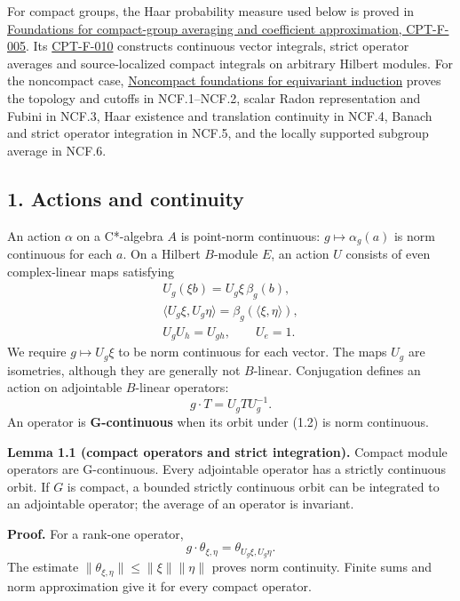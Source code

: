 \documentclass[
  11pt,
]{article}
\begin{document}
For compact groups, the Haar probability measure used below is proved in
\href{supporting/representations-of-compact-groups/compact-foundations.html\#cpt-f-005}{Foundations
for compact-group averaging and coefficient approximation, CPT-F-005}.
Its
\href{supporting/representations-of-compact-groups/compact-foundations.html\#cpt-f-010}{CPT-F-010}
constructs continuous vector integrals, strict operator averages and
source-localized compact integrals on arbitrary Hilbert modules. For the
noncompact case,
\href{supporting/noncompact-foundations/noncompact-foundations.html}{Noncompact
foundations for equivariant induction} proves the topology and cutoffs
in NCF.1--NCF.2, scalar Radon representation and Fubini in NCF.3, Haar
existence and translation continuity in NCF.4, Banach and strict
operator integration in NCF.5, and the locally supported subgroup
average in NCF.6.

\subsection{1. Actions and continuity}\label{actions-and-continuity}

An action \(\alpha\) on a C*-algebra \(A\) is point-norm continuous:
\(g\mapsto\alpha_g(a)\) is norm continuous for each \(a\). On a Hilbert
\(B\)-module \(E\), an action \(U\) consists of even complex-linear maps
satisfying \[
\begin{gathered}
U_g(\xi b)=U_g\xi\,\beta_g(b),\\
\langle U_g\xi,U_g\eta\rangle
 =\beta_g(\langle\xi,\eta\rangle),\\
U_gU_h=U_{gh},\qquad U_e=1.
\end{gathered}
\tag{1.1}
\] We require \(g\mapsto U_g\xi\) to be norm continuous for each vector.
The maps \(U_g\) are isometries, although they are generally not
\(B\)-linear. Conjugation defines an action on adjointable \(B\)-linear
operators: \[
g\cdot T=U_gTU_g^{-1}.
\tag{1.2}
\] An operator is \textbf{G-continuous} when its orbit under (1.2) is
norm continuous.

\textbf{Lemma 1.1 (compact operators and strict integration).} Compact
module operators are G-continuous. Every adjointable operator has a
strictly continuous orbit. If \(G\) is compact, a bounded strictly
continuous orbit can be integrated to an adjointable operator; the
average of an operator is invariant.

\textbf{Proof.} For a rank-one operator, \[
g\cdot\theta_{\xi,\eta}
 =\theta_{U_g\xi,U_g\eta}.
\tag{1.3}
\] The estimate \(\|\theta_{\xi,\eta}\|\leq\|\xi\|\|\eta\|\) proves norm
continuity. Finite sums and norm approximation give it for every compact
operator.
\end{document}
